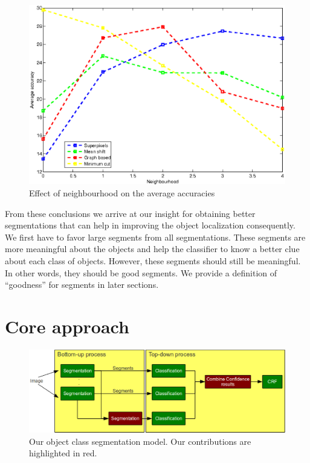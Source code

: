 \documentclass[twoside,11pt]{article}
\begin{document}
\begin{figure}
\includegraphics[scale =.65]{./Figures/neigh_acc.eps}
\centering
\caption{Effect of neighbourhood on the average accuracies}
\label{fig:neigh_effect}
\end{figure}


From these conclusions we arrive at our insight for obtaining better segmentations
that can help in improving the object localization consequently. We first have to
favor large segments from all segmentations. These segments are more meaningful about
the objects and help the classifier to know a better clue about each class of objects.
However, these segments should still be meaningful. In other words, they should be
good segments. We provide a definition of ``goodness'' for segments in later
sections.

\section{Core approach}

\begin{figure}[!t]
\centering
\includegraphics[scale=0.7]{./Figures/our_framework.eps}
\caption{Our object class segmentation model. Our contributions are highlighted in red.}
\label{fig:our_obj_seg_model}
\end{figure}
\end{document}
